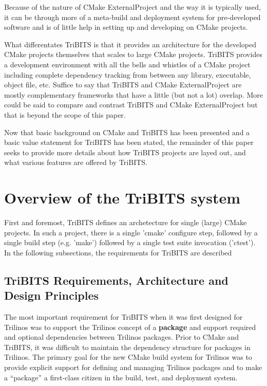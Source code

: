 \documentclass[note]{TechNote}
\begin{document}
Because of the nature of CMake ExternalProject and the way it is typically used, it can be through more of a meta-build and deployment system for pre-developed software and is of little help in setting up and developing on CMake projects.

What differentates TriBITS is that it provides an architecture for the developed CMake projects themselves that scales to large CMake projects.  TriBITS provides a development environment with all the bells and whistles of a CMake project including complete dependency tracking from between any library, executable, object file, etc.  Suffice to say that TriBITS and CMake ExternalProject are mostly complementary frameworks that have a little (but not a lot) overlap.  More could be said to compare and contrast TriBITS and CMake ExternalProject but that is beyond the scope of this paper.

Now that basic background on CMake and TriBITS has been presented and a basic value statement for TriBITS has been stated, the remainder of this paper seeks to provide more details about how TriBITS projects are layed out, and what various features are offered by TriBITS.

%
\section{Overview of the TriBITS system}
%

First and foremost, TriBITS defines an archetecture for single (large) CMake projects.  In such a project, there is a single 'cmake' configure step, followed by a single build step (e.g. 'make') followed by a single test suite invocation ('ctest').  In the following subsections, the requirements for TriBITS are described

%
\subsection{TriBITS Requirements, Architecture and Design Principles}
%

The most important requirement for TriBITS when it was first designed for Trilinos was to support the Trilinos concept of a \textbf{package} and support required and optional dependencies between Trilinos packages.  Prior to CMake and TriBITS, it was difficult to maintain the dependency structure for packages in Trilinos.  The primary goal for the new CMake build system for Trilinos was to provide explicit support for defining and managing Trilinos packages and to make a ``package'' a first-class citizen in the build, test, and deployment system.
\end{document}
